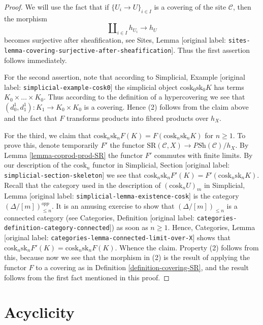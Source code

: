\documentclass[10pt,a4paper]{article}
\theoremstyle{plain}
\theoremstyle{definition}
\theoremstyle{remark}
\numberwithin{equation}{subsection}
\begin{document}
\begin{proof}
We will use the fact that if
$\{U_i \to U\}_{i \in I}$ is a covering of the site
$\mathcal{C}$, then the morphism
$$
\amalg_{i \in I} h_{U_i} \to h_U
$$
becomes surjective after sheafification, see
Sites, Lemma \textnormal{[original label: \nolinkurl{sites-lemma-covering-surjective-after-sheafification}]}.
Thus the first assertion follows immediately.

\medskip\noindent
For the second assertion, note that according to
Simplicial, Example \textnormal{[original label: \nolinkurl{simplicial-example-cosk0}]}
the simplicial object $\text{cosk}_0 \text{sk}_0 K$
has terms $K_0 \times \ldots \times K_0$. Thus
according to the definition of a hypercovering we
see that $(d^1_0, d^1_1) : K_1 \to K_0 \times K_0$ is a
covering. Hence (2) follows from the claim above
and the fact that $F$ transforms products into fibred
products over $h_X$.

\medskip\noindent
For the third, we claim that
$\text{cosk}_n \text{sk}_n F(K) =
F(\text{cosk}_n \text{sk}_n K)$ for $n \geq 1$.
To prove this, denote temporarily $F'$ the functor
$\text{SR}(\mathcal{C}, X) \to \textit{PSh}(\mathcal{C})/h_X$.
By Lemma \ref{lemma-coprod-prod-SR} the functor
$F'$ commutes with finite limits.
By our description of the $\text{cosk}_n$ functor in
Simplicial, Section \textnormal{[original label: \nolinkurl{simplicial-section-skeleton}]}
we see that $\text{cosk}_n \text{sk}_n F'(K) =
F'(\text{cosk}_n \text{sk}_n K)$.
Recall that the category used in the description of
$(\text{cosk}_n U)_m$ in
Simplicial, Lemma \textnormal{[original label: \nolinkurl{simplicial-lemma-existence-cosk}]}
is the category $(\Delta/[m])^{opp}_{\leq n}$. It is an
amusing exercise to show that $(\Delta/[m])_{\leq n}$ is
a connected category (see
Categories, Definition \textnormal{[original label: \nolinkurl{categories-definition-category-connected}]})
as soon as $n \geq 1$. Hence,
Categories, Lemma \textnormal{[original label: \nolinkurl{categories-lemma-connected-limit-over-X}]}
shows that $\text{cosk}_n \text{sk}_n F'(K) =
\text{cosk}_n \text{sk}_n F(K)$. Whence the claim.
Property (2) follows from this, because now we see that
the morphism in (2) is the result of applying the
functor $F$ to a covering as in Definition \ref{definition-covering-SR},
and the result follows from the first fact mentioned
in this proof.
\end{proof}



\section{Acyclicity}
\label{section-acyclicity}
\end{document}
